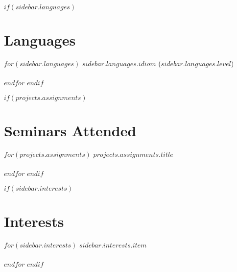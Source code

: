 \documentclass[$fontsize$, a4paper]{article}
\begin{document}
\vspace{25pt}

$if(sidebar.languages)$
\section*{Languages}
$for(sidebar.languages)$
\emph{$sidebar.languages.idiom$} ($sidebar.languages.level$)\\~\\
$endfor$
$endif$

$if(projects.assignments)$
\section*{Seminars Attended}
$for(projects.assignments)$
$projects.assignments.title$\\~\\
$endfor$
$endif$

$if(sidebar.interests)$
\section*{Interests}
$for(sidebar.interests)$
{$sidebar.interests.item$}\\~\\
$endfor$
$endif$
\end{document}
